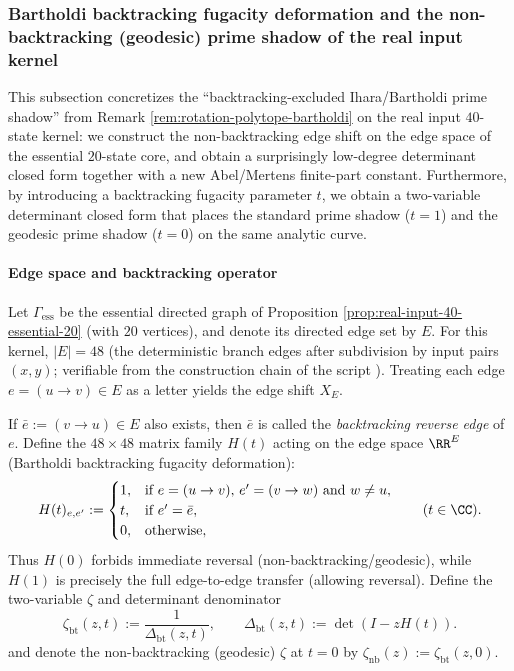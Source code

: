 \subsubsection{Bartholdi backtracking fugacity deformation and the non-backtracking (geodesic) prime shadow of the real input kernel}\label{subsec:real-input-40-geodesic-prime-shadow}
This subsection concretizes the ``backtracking-excluded Ihara/Bartholdi prime shadow'' from Remark \ref{rem:rotation-polytope-bartholdi} on the real input \(40\)-state kernel: we construct the non-backtracking edge shift on the edge space of the essential \(20\)-state core, and obtain a surprisingly low-degree determinant closed form together with a new Abel/Mertens finite-part constant.
Furthermore, by introducing a backtracking fugacity parameter \(t\), we obtain a two-variable determinant closed form that places the standard prime shadow (\(t=1\)) and the geodesic prime shadow (\(t=0\)) on the same analytic curve.

\paragraph{Edge space and backtracking operator}
Let \(\Gamma_{\mathrm{ess}}\) be the essential directed graph of Proposition \ref{prop:real-input-40-essential-20} (with \(20\) vertices), and denote its directed edge set by \(E\).
For this kernel, \(|E|=48\) (the deterministic branch edges after subdivision by input pairs \((x,y)\); verifiable from the construction chain of the script ).
Treating each edge \(e=(u\to v)\in E\) as a letter yields the edge shift \(X_E\).

If \(\bar e:=(v\to u)\in E\) also exists, then \(\bar e\) is called the \emph{backtracking reverse edge} of \(e\).
Define the \(48\times 48\) matrix family \(H(t)\) acting on the edge space \(\RR^{E}\) (Bartholdi backtracking fugacity deformation):
\[
H(t)_{e,e'} :=
\begin{cases}
1,& \text{if } e=(u\to v),\,e'=(v\to w)\ \text{and }w\neq u,\\
t,& \text{if } e'=\bar e,\\
0,& \text{otherwise},
\end{cases}
\qquad (t\in\CC).
\]
Thus \(H(0)\) forbids immediate reversal (non-backtracking/geodesic), while \(H(1)\) is precisely the full edge-to-edge transfer (allowing reversal).
Define the two-variable \(\zeta\) and determinant denominator
\[
\zeta_{\mathrm{bt}}(z,t):=\frac{1}{\Delta_{\mathrm{bt}}(z,t)},\qquad
\Delta_{\mathrm{bt}}(z,t):=\det(I-zH(t)).
\]
and denote the non-backtracking (geodesic) \(\zeta\) at \(t=0\) by \(\zeta_{\mathrm{nb}}(z):=\zeta_{\mathrm{bt}}(z,0)\).

